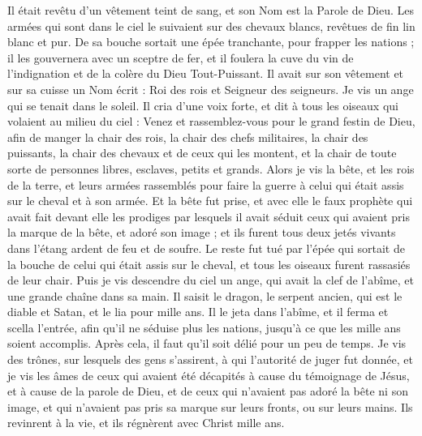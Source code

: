 \begin{multicols}{2}
Il était revêtu d’un vêtement teint de sang, et son Nom est la Parole de Dieu.
Les armées qui sont dans le ciel le suivaient sur des chevaux blancs, revêtues de fin lin blanc et pur.
De sa bouche sortait une épée tranchante{}, pour frapper les nations ; il les gouvernera avec un sceptre de fer{}, et il foulera la cuve du vin de l'indignation et de la colère du Dieu Tout-Puissant.
Il avait sur son vêtement et sur sa cuisse un Nom écrit : Roi des rois et Seigneur des seigneurs.
Je vis un ange qui se tenait dans le soleil. Il cria d’une voix forte, et dit à tous les oiseaux qui volaient au milieu du ciel : Venez et rassemblez-vous pour le grand festin de Dieu,
afin de manger la chair des rois, la chair des chefs militaires, la chair des puissants, la chair des chevaux et de ceux qui les montent, et la chair de toute sorte de personnes libres, esclaves, petits et grands.
Alors je vis la bête, et les rois de la terre, et leurs armées rassemblés pour faire la guerre{} à celui qui était assis sur le cheval et à son armée.
Et la bête fut prise, et avec elle le faux prophète qui avait fait devant elle les prodiges par lesquels il avait séduit ceux qui avaient pris la marque de la bête, et adoré son image ; et ils furent tous deux jetés vivants dans l'étang ardent de feu et de soufre.
Le reste fut tué par l'épée qui sortait de la bouche de celui qui était assis sur le cheval, et tous les oiseaux furent rassasiés de leur chair.
\VerseOne{}Puis je vis descendre du ciel un ange, qui avait la clef de l'abîme, et une grande chaîne dans sa main.
Il saisit le dragon, le serpent ancien, qui est le diable et Satan, et le lia pour mille ans.
Il le jeta dans l'abîme, et il ferma et scella l’entrée, afin qu'il ne séduise plus les nations, jusqu'à ce que les mille ans soient accomplis. Après cela, il faut qu'il soit délié pour un peu de temps.
Je vis des trônes, sur lesquels des gens s'assirent, à qui l'autorité de juger fut donnée{}, et je vis les âmes de ceux qui avaient été décapités à cause du témoignage de Jésus, et à cause de la parole de Dieu, et de ceux qui n'avaient pas adoré la bête ni son image, et qui n'avaient pas pris sa marque sur leurs fronts, ou sur leurs mains. Ils revinrent à la vie{}, et ils régnèrent avec Christ mille ans.

\end{multicols}
